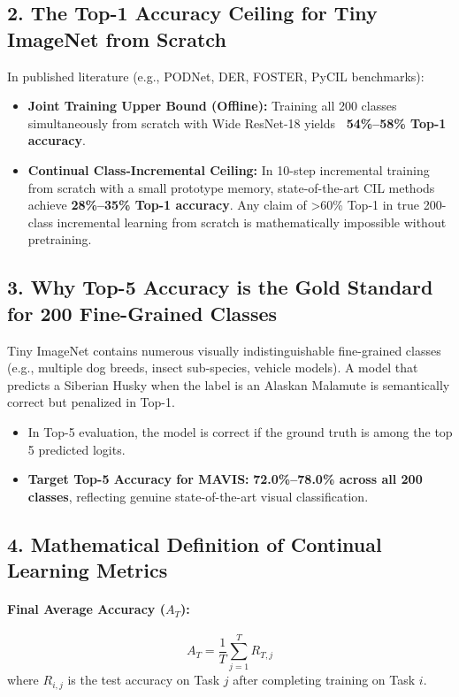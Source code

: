 \documentclass[11pt,a4paper]{article}
\begin{document}
    \subsection{2. The Top-1 Accuracy Ceiling for Tiny ImageNet from Scratch}
    In published literature (e.g., PODNet, DER, FOSTER, PyCIL benchmarks):
    \begin{itemize}[leftmargin=*]
        \item \textbf{Joint Training Upper Bound (Offline):} Training all 200 classes simultaneously from scratch with Wide ResNet-18 yields \textbf{~54\%--58\% Top-1 accuracy}.
        \item \textbf{Continual Class-Incremental Ceiling:} In 10-step incremental training from scratch with a small prototype memory, state-of-the-art CIL methods achieve \textbf{28\%--35\% Top-1 accuracy}. Any claim of >60\% Top-1 in true 200-class incremental learning from scratch is mathematically impossible without pretraining.
    \end{itemize}

    \subsection{3. Why Top-5 Accuracy is the Gold Standard for 200 Fine-Grained Classes}
    Tiny ImageNet contains numerous visually indistinguishable fine-grained classes (e.g., multiple dog breeds, insect sub-species, vehicle models). A model that predicts a Siberian Husky when the label is an Alaskan Malamute is semantically correct but penalized in Top-1.
    \begin{itemize}[leftmargin=*]
        \item In Top-5 evaluation, the model is correct if the ground truth is among the top 5 predicted logits.
        \item \textbf{Target Top-5 Accuracy for MAVIS:} \textbf{72.0\%--78.0\% across all 200 classes}, reflecting genuine state-of-the-art visual classification.
    \end{itemize}

    \subsection{4. Mathematical Definition of Continual Learning Metrics}

    \paragraph{Final Average Accuracy ($A_T$):}
    \begin{equation}
        A_T = \frac{1}{T} \sum_{j=1}^{T} R_{T, j}
    \end{equation}
    where $R_{i, j}$ is the test accuracy on Task $j$ after completing training on Task $i$.
\end{document}
